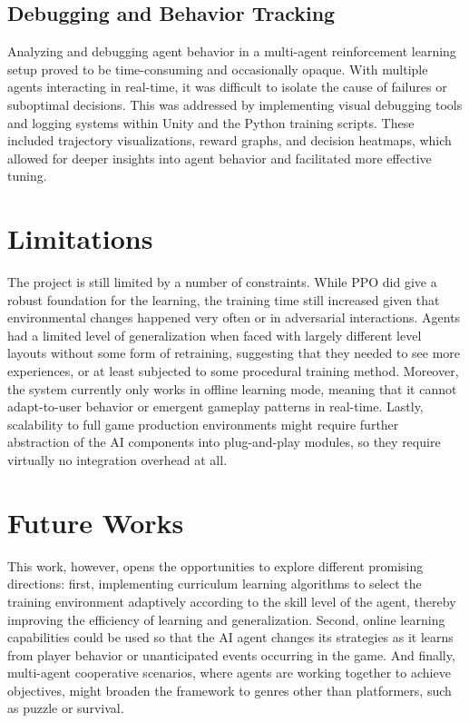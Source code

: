 \documentclass[12pt,oneside,openright,a4paper]{cpe-english-project}
\begin{document}
\subsection{Debugging and Behavior Tracking}
Analyzing and debugging agent behavior in a multi-agent reinforcement learning setup proved to be time-consuming and occasionally opaque. With multiple agents interacting in real-time, it was difficult to isolate the cause of failures or suboptimal decisions. This was addressed by implementing visual debugging tools and logging systems within Unity and the Python training scripts. These included trajectory visualizations, reward graphs, and decision heatmaps, which allowed for deeper insights into agent behavior and facilitated more effective tuning.\par
\section{Limitations}
The project is still limited by a number of constraints. While PPO did give a robust foundation for the learning, the training time still increased given that environmental changes happened very often or in adversarial interactions. Agents had a limited level of generalization when faced with largely different level layouts without some form of retraining, suggesting that they needed to see more experiences, or at least subjected to some procedural training method. Moreover, the system currently only works in offline learning mode, meaning that it cannot adapt-to-user behavior or emergent gameplay patterns in real-time. Lastly, scalability to full game production environments might require further abstraction of the AI components into plug-and-play modules, so they require virtually no integration overhead at all.
\section{Future Works}
This work, however, opens the opportunities to explore different promising directions: first, implementing curriculum learning algorithms to select the training environment adaptively according to the skill level of the agent, thereby improving the efficiency of learning and generalization. Second, online learning capabilities could be used so that the AI agent changes its strategies as it learns from player behavior or unanticipated events occurring in the game. And finally, multi-agent cooperative scenarios, where agents are working together to achieve objectives, might broaden the framework to genres other than platformers, such as puzzle or survival.
\end{document}
